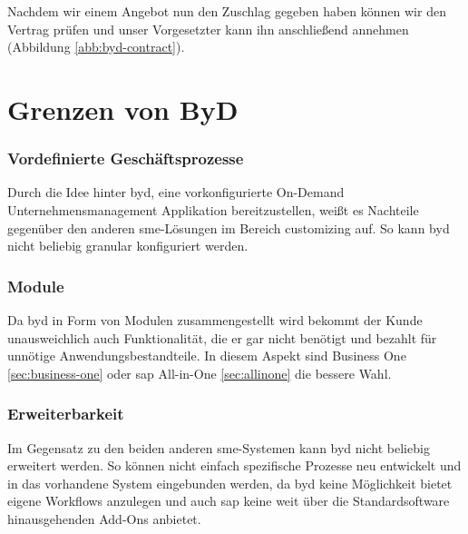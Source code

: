 Nachdem wir einem Angebot nun den Zuschlag gegeben haben können wir den Vertrag prüfen und unser Vorgesetzter kann ihn anschließend annehmen (Abbildung \ref{abb:byd-contract}).

\section{Grenzen von ByD}

\subsubsection{Vordefinierte Geschäftsprozesse}

Durch die Idee hinter \gls{byd}, eine vorkonfigurierte On-Demand Unternehmensmanagement Applikation bereitzustellen, weißt es Nachteile gegenüber den anderen \gls{sme}-Lösungen im Bereich \gls{customizing} auf. So kann \gls{byd} nicht beliebig granular konfiguriert werden.

\subsubsection{Module}

Da \gls{byd} in Form von Modulen zusammengestellt wird bekommt der Kunde unausweichlich auch Funktionalität, die er gar nicht benötigt und bezahlt für unnötige Anwendungsbestandteile. In diesem Aspekt sind Business One \ref{sec:business-one} oder \gls{sap} All-in-One \ref{sec:allinone} die bessere Wahl.

\subsubsection{Erweiterbarkeit}

Im Gegensatz zu den beiden anderen \gls{sme}-Systemen kann \gls{byd} nicht beliebig erweitert werden. So können nicht einfach spezifische Prozesse neu entwickelt und in das vorhandene System eingebunden werden, da \gls{byd} keine Möglichkeit bietet eigene Workflows anzulegen und auch \gls{sap} keine weit über die Standardsoftware hinausgehenden Add-Ons anbietet.

